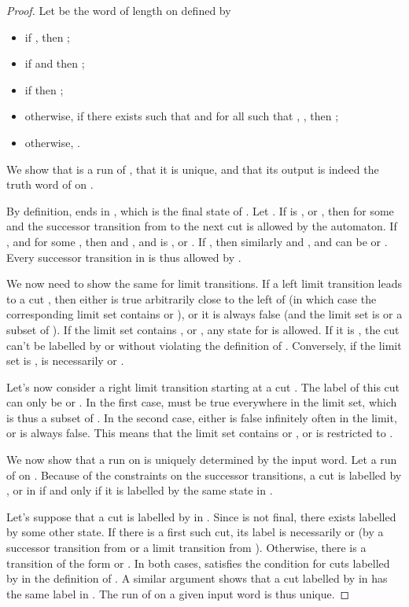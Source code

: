\documentclass[envcountsame]{fsttcs-ps}
\begin{document}
\begin{proof}
Let  be the word of length  on  defined by
\begin{itemize}
\item if , then ;
\item if  and  then ;
\item if  then ;
\item otherwise, if there exists  such that  and for all
 such that , , then ;
\item otherwise, .
\end{itemize}
We show that  is a run of , that it is unique, and
that its output is indeed the truth word of  on .


By definition,  ends in , which is the final state of
.  Let .  If  is ,  
or , then  for some  and the successor transition from 
to the next cut is allowed by the automaton.  If , and  for some , then  and , and  is ,
 or .  If , then similarly  and , and  can be  or .  Every successor transition in
 is thus allowed by .

We now need to show the same for limit transitions.
If a left limit transition leads to a cut , then either  is true
arbitrarily close to the left of  (in which case the corresponding limit
set contains  or ), or it is always false (and the limit set is
 or a subset of ).  If the limit set contains ,
 or , any state for  is allowed.  If it is , the cut 
can't be labelled by  or  without violating the definition of
.  Conversely, if the limit set is ,  is necessarily
 or .

Let's now consider a right limit transition starting at a cut .  The label
of this cut can only be  or .  In the first case,  must
be true everywhere in the limit set, which is thus a subset of .
In the second case, either  is false infinitely often in the limit,
or  is always false.  This means that the limit set contains  or
, or is restricted to .

We now show that a run on  is uniquely determined by the input
word.
Let  a run of  on .  Because of the constraints on
the successor transitions, a cut  is labelled by ,  or  in
 if and only if it is labelled by the same state in .

Let's suppose that a cut  is labelled by  in .  Since  is
not final, there exists  labelled by some other state.  If there is a
first such cut, its label is necessarily  or  (by a successor
transition from  or a limit transition from ).  Otherwise, there
is a transition of the form  or .  In both cases,  satisfies the condition for cuts labelled by
 in the definition of .
A similar argument shows that a cut labelled by  in  has the same
label in .  The run of  on a given input word is thus
unique.


\end{proof}
\end{document}
